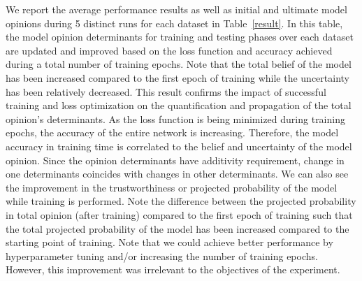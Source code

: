 We report the average performance results as well as initial and ultimate model opinions during 5 distinct runs for each dataset in Table~\ref{result}. In this table, the model opinion determinants for training and testing phases over each dataset are updated and improved based on the loss function and accuracy achieved during a total number of training epochs. Note that the total belief of the model has been increased compared to the first epoch of training while the uncertainty has been relatively decreased. This result confirms the impact of successful training and loss optimization on the quantification and propagation of the total opinion's determinants. As the loss function is being minimized during training epochs, the accuracy of the entire network is increasing. Therefore, the model accuracy in training time is correlated to the belief and uncertainty of the model opinion. Since the opinion determinants have additivity requirement, change in one determinants coincides with changes in other determinants. 
We can also see the improvement in the trustworthiness or projected probability of the model while training is performed. Note the difference between the projected probability in total opinion (after training) compared to the first epoch of training such that the total projected probability of the model has been increased compared to the starting point of training. Note that we could achieve better performance by hyperparameter tuning and/or increasing the number of training epochs. However, this improvement was irrelevant to the objectives of the experiment.  




